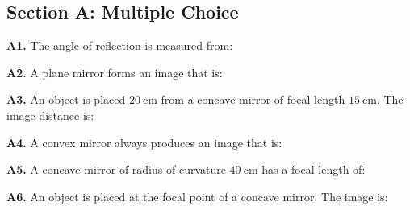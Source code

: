 \newpage
\begin{exercisebox}[19]

\subsection*{Section A: Multiple Choice}

\textbf{A1.} The angle of reflection is measured
from:


\vspace{0.4cm}

\textbf{A2.} A plane mirror forms an image that is:


\vspace{0.4cm}

\textbf{A3.} An object is placed $20\ \text{cm}$
from a concave mirror of focal length $15\ \text{cm}$.
The image distance is:


\vspace{0.4cm}

\textbf{A4.} A convex mirror always produces an
image that is:


\vspace{0.4cm}

\textbf{A5.} A concave mirror of radius of curvature
$40\ \text{cm}$ has a focal length of:


\vspace{0.4cm}

\textbf{A6.} An object is placed at the focal point
of a concave mirror. The image is:


\end{exercisebox}

